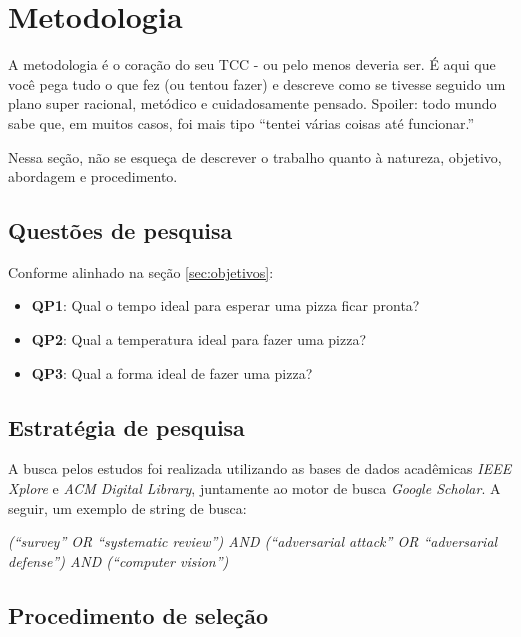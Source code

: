 \chapter{Metodologia}
\label{chap:metodologia}

A metodologia é o coração do seu TCC - ou pelo menos deveria ser. É aqui que você pega tudo o que fez (ou tentou fazer) e descreve como se tivesse seguido um plano super racional, metódico e cuidadosamente pensado. Spoiler: todo mundo sabe que, em muitos casos, foi mais tipo \enquote{tentei várias coisas até funcionar.}

Nessa seção, não se esqueça de descrever o trabalho quanto à natureza, objetivo, abordagem e procedimento. 

\section{Questões de pesquisa}
\label{sub:questoes_pesquisa}

Conforme alinhado na seção \ref{sec:objetivos}:

\begin{itemize}
    \item \textbf{QP1}: Qual o tempo ideal para esperar uma pizza ficar pronta?
    \item \textbf{QP2}: Qual a temperatura ideal para fazer uma pizza?
    \item \textbf{QP3}: Qual a forma ideal de fazer uma pizza?
\end{itemize}

\section{Estratégia de pesquisa}
\label{sub:estrategia_pesquisa}

A busca pelos estudos foi realizada utilizando as bases de dados acadêmicas \textit{\gls{IEEE} Xplore} e \textit{\gls{ACM} Digital Library}, juntamente ao motor de busca \textit{Google Scholar}. A seguir, um exemplo de string de busca: \newline

\textit{(\enquote{survey} OR \enquote{systematic review}) AND (\enquote{adversarial attack} OR \enquote{adversarial defense}) AND (\enquote{computer vision})}\newline

\section{Procedimento de seleção}
\label{sub:selecao_pesquisa}

